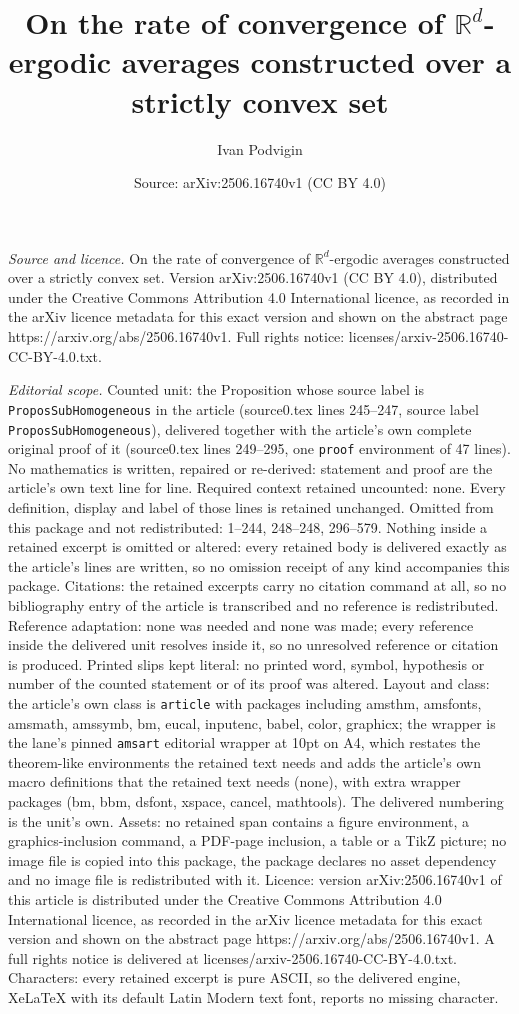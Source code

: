 \documentclass[10pt,a4paper]{amsart}
\title[On the rate of convergence of $\mathbb{R}^d$-ergodic average]{On the rate of convergence of $\mathbb{R}^d$-ergodic averages constructed over a strictly convex set}
\author{Ivan Podvigin}
\date{Source: arXiv:2506.16740v1 (CC BY 4.0)}
\begin{document}
\maketitle

\noindent\emph{Source and licence.} On the rate of convergence of $\mathbb{R}^d$-ergodic averages constructed over a strictly convex set. Version arXiv:2506.16740v1 (CC BY 4.0), distributed under the Creative Commons Attribution 4.0 International licence, as recorded in the arXiv licence metadata for this exact version and shown on the abstract page https://arxiv.org/abs/2506.16740v1. Full rights notice: licenses/arxiv-2506.16740-CC-BY-4.0.txt.\par\smallskip

\noindent\textit{Editorial scope.} Counted unit: the Proposition whose source label is \texttt{ProposSubHomogeneous} in the article (source0.tex lines 245--247, source label \texttt{ProposSubHomogeneous}), delivered together with the article's own complete original proof of it (source0.tex lines 249--295, one \texttt{proof} environment of 47 lines). No mathematics is written, repaired or re-derived: statement and proof are the article's own text line for line. Required context retained uncounted: none. Every definition, display and label of those lines is retained unchanged. Omitted from this package and not redistributed: 1--244, 248--248, 296--579. Nothing inside a retained excerpt is omitted or altered: every retained body is delivered exactly as the article's lines are written, so no omission receipt of any kind accompanies this package. Citations: the retained excerpts carry no citation command at all, so no bibliography entry of the article is transcribed and no reference is redistributed. Reference adaptation: none was needed and none was made; every reference inside the delivered unit resolves inside it, so no unresolved reference or citation is produced. Printed slips kept literal: no printed word, symbol, hypothesis or number of the counted statement or of its proof was altered. Layout and class: the article's own class is \texttt{article} with packages including amsthm, amsfonts, amsmath, amssymb, bm, eucal, inputenc, babel, color, graphicx; the wrapper is the lane's pinned \texttt{amsart} editorial wrapper at 10pt on A4, which restates the theorem-like environments the retained text needs and adds the article's own macro definitions that the retained text needs (none), with extra wrapper packages (bm, bbm, dsfont, xspace, cancel, mathtools). The delivered numbering is the unit's own. Assets: no retained span contains a figure environment, a graphics-inclusion command, a PDF-page inclusion, a table or a TikZ picture; no image file is copied into this package, the package declares no asset dependency and no image file is redistributed with it. Licence: version arXiv:2506.16740v1 of this article is distributed under the Creative Commons Attribution 4.0 International licence, as recorded in the arXiv licence metadata for this exact version and shown on the abstract page https://arxiv.org/abs/2506.16740v1. A full rights notice is delivered at licenses/arxiv-2506.16740-CC-BY-4.0.txt. Characters: every retained excerpt is pure ASCII, so the delivered engine, XeLaTeX with its default Latin Modern text font, reports no missing character.
\end{document}
